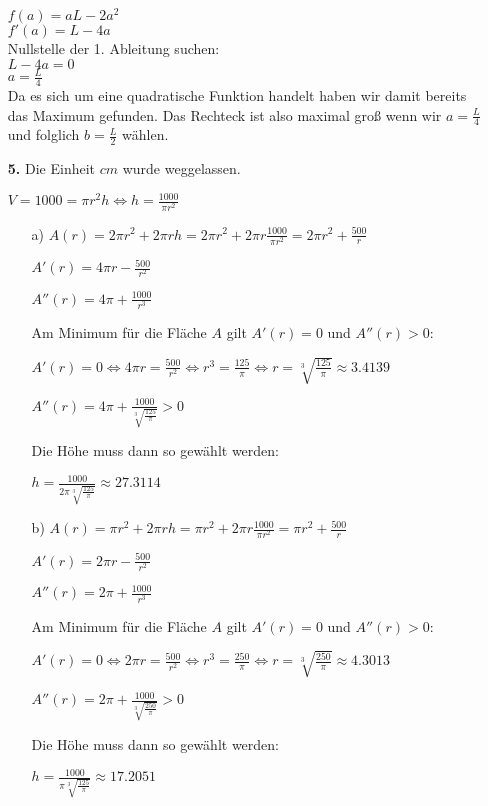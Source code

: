 \documentclass[a4paper,11pt]{scrartcl}
\begin{document}
\begin{enumerate}
        \(f(a) = aL - 2a^2\) \\
        \(f'(a) = L - 4a\) \\

        Nullstelle der 1. Ableitung suchen: \\

        \(L - 4a = 0\) \\
        \(a = \frac{L}{4}\) \\

        Da es sich um eine quadratische Funktion handelt haben wir damit bereits das Maximum gefunden.
        Das Rechteck ist also maximal groß wenn wir $a = \frac{L}{4}$ und folglich $b = \frac{L}{2}$ wählen.
    \item[\textbf{5.}]
        Die Einheit $cm$ wurde weggelassen.

        \( V = 1000 = \pi r^2 h \Leftrightarrow h = \frac{1000}{\pi r^2} \)

        \begin{enumerate}
            \item[a)]
                \( A(r) = 2 \pi r^2 + 2 \pi r h = 2 \pi r^2 + 2 \pi r \frac{1000}{\pi r^2} = 2 \pi r^2 + \frac{500}{r} \)

                \( A'(r) = 4 \pi r - \frac{500}{r^2} \)

                \( A''(r) = 4 \pi + \frac{1000}{r^3} \)

                Am Minimum für die Fläche $A$ gilt $A'(r) = 0$ und $A''(r) > 0$:

                \( A'(r) = 0 \Leftrightarrow 4 \pi r = \frac{500}{r^2} \Leftrightarrow r^3 = \frac{125}{\pi} \Leftrightarrow r = \sqrt[3]{\frac{125}{\pi}} \approx 3.4139 \)

                \( A''(r) = 4 \pi + \frac{1000}{\sqrt[3]{\frac{125}{\pi}}} > 0 \)

                Die Höhe muss dann so gewählt werden:

                \( h = \frac{1000}{2 \pi \sqrt[3]{\frac{125}{\pi}}} \approx 27.3114 \)

            \item[b)]
                \( A(r) = \pi r^2 + 2 \pi r h = \pi r^2 + 2 \pi r \frac{1000}{\pi r^2} = \pi r^2 + \frac{500}{r} \)

                \( A'(r) = 2 \pi r - \frac{500}{r^2} \)

                \( A''(r) = 2 \pi + \frac{1000}{r^3} \)

                Am Minimum für die Fläche $A$ gilt $A'(r) = 0$ und $A''(r) > 0$:

                \( A'(r) = 0 \Leftrightarrow 2 \pi r = \frac{500}{r^2} \Leftrightarrow r^3 = \frac{250}{\pi} \Leftrightarrow r = \sqrt[3]{\frac{250}{\pi}} \approx 4.3013 \)

                \( A''(r) = 2 \pi + \frac{1000}{\sqrt[3]{\frac{250}{\pi}}} > 0 \)

                Die Höhe muss dann so gewählt werden:

                \( h = \frac{1000}{\pi \sqrt[3]{\frac{125}{\pi}}} \approx 17.2051 \)
        \end{enumerate}
    \end{enumerate}
\end{document}
